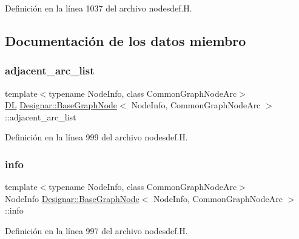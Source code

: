 Definición en la línea 1037 del archivo nodesdef.\+H.



\subsection{Documentación de los datos miembro}
\mbox{\label{class_designar_1_1_base_graph_node_a160dab27497d195ecdf93272a40a2cb5}} 
\subsubsection{\texorpdfstring{adjacent\+\_\+arc\+\_\+list}{adjacent\_arc\_list}}
{\footnotesize\ttfamily template$<$typename Node\+Info, class Common\+Graph\+Node\+Arc$>$ \\
\hyperlink{class_designar_1_1_d_l}{DL} \hyperlink{class_designar_1_1_base_graph_node}{Designar\+::\+Base\+Graph\+Node}$<$ Node\+Info, Common\+Graph\+Node\+Arc $>$\+::adjacent\+\_\+arc\+\_\+list\hspace{0.3cm}{\ttfamily [protected]}}



Definición en la línea 999 del archivo nodesdef.\+H.

\mbox{\label{class_designar_1_1_base_graph_node_a78196723c561b3554cf8760ab2d902a8}} 
\subsubsection{\texorpdfstring{info}{info}}
{\footnotesize\ttfamily template$<$typename Node\+Info, class Common\+Graph\+Node\+Arc$>$ \\
Node\+Info \hyperlink{class_designar_1_1_base_graph_node}{Designar\+::\+Base\+Graph\+Node}$<$ Node\+Info, Common\+Graph\+Node\+Arc $>$\+::info\hspace{0.3cm}{\ttfamily [protected]}}



Definición en la línea 997 del archivo nodesdef.\+H.

